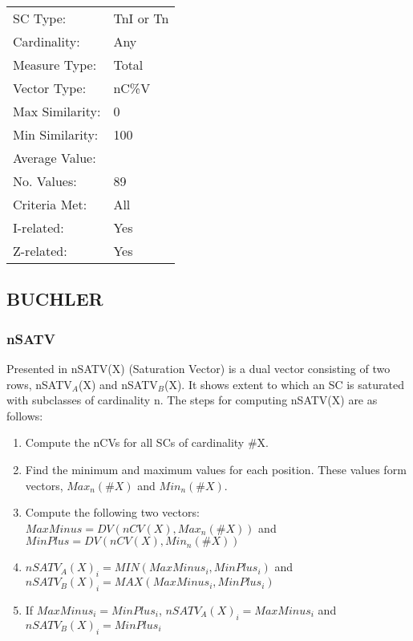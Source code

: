 \documentclass{article}
\begin{document}
\begin{center}
\begin{tabular}{ll}
 SC Type:         &  TnI or Tn  \\
 Cardinality:     &  Any        \\
 Measure Type:    &  Total      \\
 Vector Type:     &  nC\%V      \\
 Max Similarity:  &  0          \\
 Min Similarity:  &  100        \\
 Average Value:   &             \\
 No. Values:      &  89         \\
 Criteria Met:    &  All        \\
 I-related:       &  Yes        \\
 Z-related:       &  Yes        \\
\end{tabular}
\end{center}
\subsection{BUCHLER}
\label{sec-11-9}
\subsubsection{nSATV}
\label{sec-11-9-1}

Presented in \citet[chap. 2.3]{Buchler1997} nSATV(X) (Saturation
Vector) is a dual vector consisting of two rows, nSATV$_{A}$(X) and
nSATV$_{B}$(X). It shows extent to which an SC is saturated with
subclasses of cardinality n. The steps for computing nSATV(X) are
as follows:

\begin{enumerate}
\item Compute the nCVs for all SCs of cardinality \#X.
\item Find the minimum and maximum values for each position. These
   values form vectors, $Max_{n}(\#X)$ and $Min_{n}(\#X)$.
\item Compute the following two vectors:
   $MaxMinus=DV(nCV(X),Max_{n}(\#X))$ and $MinPlus=DV(nCV(X),Min_{n}(\#X))$
\item $nSATV_{A}(X)_{i}=MIN(MaxMinus_{i},MinPlus_{i})$ and
   $nSATV_{B}(X)_{i}=MAX(MaxMinus_{i},MinPlus_{i})$
\item If $MaxMinus_{i}=MinPlus_{i}$, $nSATV_{A}(X)_{i}=MaxMinus_{i}$
   and $nSATV_{B}(X)_{i}=MinPlus_{i}$
\end{enumerate}
\end{document}
